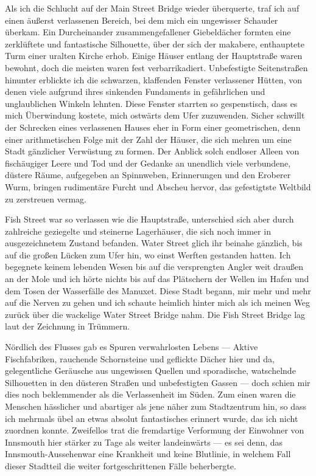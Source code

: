 Als ich die Schlucht auf der Main Street Bridge wieder überquerte, traf ich auf einen äußerst verlassenen Bereich, bei dem mich ein ungewisser Schauder überkam. Ein Durcheinander zusammengefallener Giebeldächer formten eine zerklüftete und fantastische Silhouette, über der sich der makabere, enthauptete Turm einer uralten Kirche erhob. Einige Häuser entlang der Hauptstraße waren bewohnt, doch die meisten waren fest verbarrikadiert. Unbefestigte Seitenstraßen hinunter erblickte ich die schwarzen, klaffenden Fenster verlassener Hütten, von denen viele aufgrund ihres sinkenden Fundaments in gefährlichen und unglaublichen Winkeln lehnten.
Diese Fenster starrten so gespenstisch, dass es mich Überwindung kostete, mich ostwärts dem Ufer zuzuwenden. Sicher schwillt der Schrecken eines verlassenen Hauses eher in Form einer geometrischen, denn einer arithmetischen Folge mit der Zahl der Häuser, die sich mehren um eine Stadt gänzlicher Verwüstung zu formen. Der Anblick solch endloser Alleen von fischäugiger Leere und Tod und der Gedanke an unendlich viele verbundene, düstere Räume, aufgegeben an Spinnweben, Erinnerungen und den Eroberer Wurm, bringen rudimentäre Furcht und Abscheu hervor, das gefestigtste Weltbild zu zerstreuen vermag.

Fish Street war so verlassen wie die Hauptstraße, unterschied sich aber durch zahlreiche geziegelte und steinerne Lagerhäuser, die sich noch immer in ausgezeichnetem Zustand befanden. Water Street glich ihr beinahe gänzlich, bis auf die großen Lücken zum Ufer hin, wo einst Werften gestanden hatten. Ich begegnete keinem lebenden Wesen bis auf die versprengten Angler weit draußen an der Mole und ich hörte nichts bis auf das Plätschern der Wellen im Hafen und dem Tosen der Wasserfälle des Manuxet. Diese Stadt begann, mir mehr und mehr auf die Nerven zu gehen und ich schaute heimlich hinter mich als ich meinen Weg zurück über die wackelige Water Street Bridge nahm. Die Fish Street Bridge lag laut der Zeichnung in Trümmern.

Nördlich des Flusses gab es Spuren verwahrlosten Lebens --- Aktive Fischfabriken, rauchende Schornsteine und geflickte Dächer hier und da, gelegentliche Geräusche aus ungewissen Quellen und sporadische, watschelnde Silhouetten in den düsteren Straßen und unbefestigten Gassen --- doch schien mir dies noch beklemmender als die Verlassenheit im Süden. Zum einen waren die Menschen hässlicher und abartiger als jene näher zum Stadtzentrum hin, so dass ich mehrmals übel an etwas absolut fantastisches erinnert wurde, das ich nicht zuordnen konnte. Zweifellos trat die fremdartige Verformung der Einwohner von Innsmouth hier stärker zu Tage als weiter landeinwärts --- es sei denn, das \glqq Innsmouth-Aussehen\grqq war eine Krankheit und keine Blutlinie, in welchem Fall dieser Stadtteil die weiter fortgeschrittenen Fälle beherbergte.

